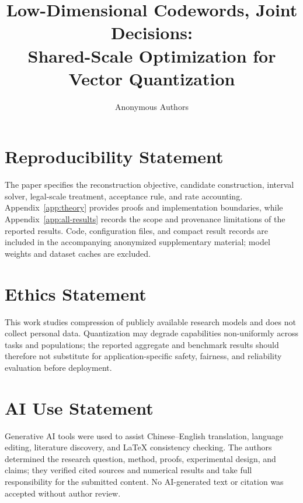 \documentclass{article}
\title{Low-Dimensional Codewords, Joint Decisions:\\Shared-Scale Optimization for Vector Quantization}
\author{Anonymous Authors}
\begin{document}
\maketitle








\section*{Reproducibility Statement}
The paper specifies the reconstruction objective, candidate construction, interval solver, legal-scale treatment, acceptance rule, and rate accounting. Appendix~\ref{app:theory} provides proofs and implementation boundaries, while Appendix~\ref{app:all-results} records the scope and provenance limitations of the reported results. Code, configuration files, and compact result records are included in the accompanying anonymized supplementary material; model weights and dataset caches are excluded.

\section*{Ethics Statement}
This work studies compression of publicly available research models and does not collect personal data. Quantization may degrade capabilities non-uniformly across tasks and populations; the reported aggregate and benchmark results should therefore not substitute for application-specific safety, fairness, and reliability evaluation before deployment.

\section*{AI Use Statement}
Generative AI tools were used to assist Chinese--English translation, language editing, literature discovery, and LaTeX consistency checking. The authors determined the research question, method, proofs, experimental design, and claims; they verified cited sources and numerical results and take full responsibility for the submitted content. No AI-generated text or citation was accepted without author review.
\clearpage


\clearpage
\appendix


\end{document}
